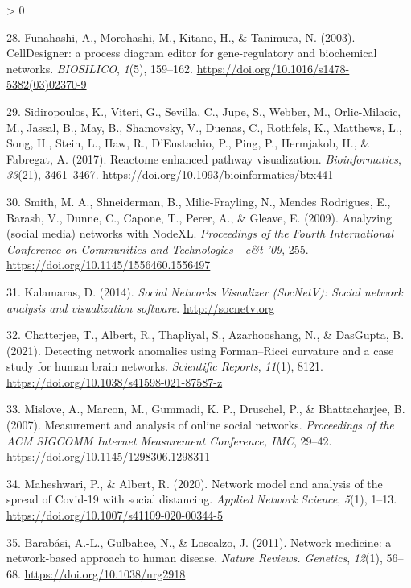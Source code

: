 \documentclass[
  12pt,
]{book}
\newlength{\cslhangindent}
\newenvironment{CSLReferences}[2] %
 {%
  \setlength{\parindent}{0pt}
  \ifodd #1 \everypar{\setlength{\hangindent}{\cslhangindent}}\ignorespaces\fi
  \ifnum #2 > 0
  \setlength{\parskip}{#2\baselineskip}
  \fi
 }%
 {}
\begin{document}
\begin{CSLReferences}{1}{0}
\leavevmode\hypertarget{ref-Funahashi2003}{}%
28. Funahashi, A., Morohashi, M., Kitano, H., \& Tanimura, N. (2003). {CellDesigner: a process diagram editor for gene-regulatory and biochemical networks}. \emph{BIOSILICO}, \emph{1}(5), 159--162. \url{https://doi.org/10.1016/s1478-5382(03)02370-9}

\leavevmode\hypertarget{ref-Sidiropoulos2017}{}%
29. Sidiropoulos, K., Viteri, G., Sevilla, C., Jupe, S., Webber, M., Orlic-Milacic, M., Jassal, B., May, B., Shamovsky, V., Duenas, C., Rothfels, K., Matthews, L., Song, H., Stein, L., Haw, R., D'Eustachio, P., Ping, P., Hermjakob, H., \& Fabregat, A. (2017). {Reactome enhanced pathway visualization}. \emph{Bioinformatics}, \emph{33}(21), 3461--3467. \url{https://doi.org/10.1093/bioinformatics/btx441}

\leavevmode\hypertarget{ref-Smith2009}{}%
30. Smith, M. A., Shneiderman, B., Milic-Frayling, N., Mendes Rodrigues, E., Barash, V., Dunne, C., Capone, T., Perer, A., \& Gleave, E. (2009). {Analyzing (social media) networks with NodeXL}. \emph{Proceedings of the Fourth International Conference on Communities and Technologies - c{\&}t '09}, 255. \url{https://doi.org/10.1145/1556460.1556497}

\leavevmode\hypertarget{ref-Kalamaras2014}{}%
31. Kalamaras, D. (2014). \emph{{Social Networks Visualizer (SocNetV): Social network analysis and visualization software}}. \url{http://socnetv.org}

\leavevmode\hypertarget{ref-Chatterjee2021}{}%
32. Chatterjee, T., Albert, R., Thapliyal, S., Azarhooshang, N., \& DasGupta, B. (2021). {Detecting network anomalies using Forman--Ricci curvature and a case study for human brain networks}. \emph{Scientific Reports}, \emph{11}(1), 8121. \url{https://doi.org/10.1038/s41598-021-87587-z}

\leavevmode\hypertarget{ref-Mislove2007}{}%
33. Mislove, A., Marcon, M., Gummadi, K. P., Druschel, P., \& Bhattacharjee, B. (2007). {Measurement and analysis of online social networks}. \emph{Proceedings of the ACM SIGCOMM Internet Measurement Conference, IMC}, 29--42. \url{https://doi.org/10.1145/1298306.1298311}

\leavevmode\hypertarget{ref-Maheshwari2020}{}%
34. Maheshwari, P., \& Albert, R. (2020). {Network model and analysis of the spread of Covid-19 with social distancing}. \emph{Applied Network Science}, \emph{5}(1), 1--13. \url{https://doi.org/10.1007/s41109-020-00344-5}

\leavevmode\hypertarget{ref-Barabasi2011}{}%
35. Barabási, A.-L., Gulbahce, N., \& Loscalzo, J. (2011). {Network medicine: a network-based approach to human disease.} \emph{Nature Reviews. Genetics}, \emph{12}(1), 56--68. \url{https://doi.org/10.1038/nrg2918}


\end{CSLReferences}
\end{document}
